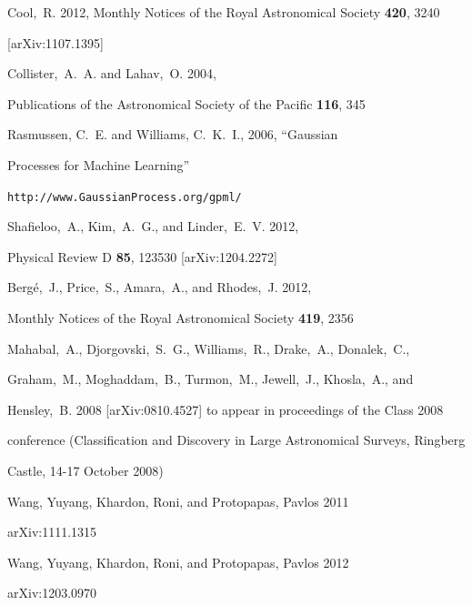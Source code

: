 \documentclass[prd,nofootbib,floatfix,11pt,tightenlines,nofootinbib]{revtex4}
\begin{document}
\begin{thebibliography}{99}
Cool,~R. 2012, Monthly Notices of the Royal Astronomical Society {\bf 420}, 3240

[arXiv:1107.1395]




Collister,~A.~A. and Lahav,~O. 2004,

Publications of the Astronomical Society of the Pacific {\bf 116}, 345




Rasmussen, C.~E. and Williams, C.~K.~I., 2006, ``Gaussian

Processes for Machine Learning''

\verb|http://www.GaussianProcess.org/gpml/|




Shafieloo,~A., Kim,~A.~G., and Linder,~E.~V. 2012,

Physical Review D {\bf 85}, 123530 [arXiv:1204.2272]




Berg\'e,~J., Price,~S., Amara,~A., and Rhodes,~J. 2012,

Monthly Notices of the Royal Astronomical Society {\bf 419}, 2356




Mahabal,~A., Djorgovski,~S.~G., Williams,~R., Drake,~A., Donalek,~C.,

Graham,~M., Moghaddam,~B., Turmon,~M., Jewell,~J., Khosla,~A., and

Hensley,~B. 2008 [arXiv:0810.4527] to appear in proceedings of the Class 2008

conference (Classification and Discovery in Large Astronomical Surveys, Ringberg

Castle, 14-17 October 2008)




Wang, Yuyang, Khardon, Roni, and Protopapas, Pavlos 2011

arXiv:1111.1315




Wang, Yuyang, Khardon, Roni, and Protopapas, Pavlos 2012

arXiv:1203.0970




\end{thebibliography}
\end{document}
